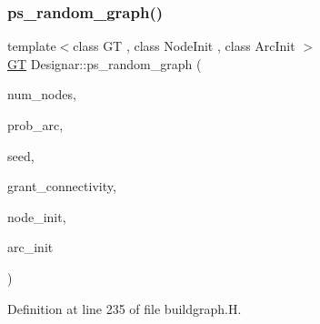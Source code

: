 \subsubsection{\texorpdfstring{ps\+\_\+random\+\_\+graph()}{ps\_random\_graph()}\hspace{0.1cm}{\footnotesize\ttfamily [1/2]}}
{\footnotesize\ttfamily template$<$class GT , class Node\+Init , class Arc\+Init $>$ \\
\hyperlink{demo-buildgraph_8_c_a3001c40d2c31ca87ed96cd7d1334a55e}{GT} Designar\+::ps\+\_\+random\+\_\+graph (\begin{DoxyParamCaption}\item[{\hyperlink{namespace_designar_aa72662848b9f4815e7bf31a7cf3e33d1}{nat\+\_\+t}}]{num\+\_\+nodes,  }\item[{\hyperlink{namespace_designar_aca2c32af26808dbec1f3a3071fad25ce}{real\+\_\+t}}]{prob\+\_\+arc,  }\item[{\hyperlink{namespace_designar_ad621b5646d45288c5d6a1e1dfe7531a8}{rng\+\_\+seed\+\_\+t}}]{seed,  }\item[{bool}]{grant\+\_\+connectivity,  }\item[{Node\+Init \&}]{node\+\_\+init,  }\item[{Arc\+Init \&}]{arc\+\_\+init }\end{DoxyParamCaption})}



Definition at line 235 of file buildgraph.\+H.

\mbox{\label{namespace_designar_a184e6b7e77faae803df7f45c68c5359a}} 
